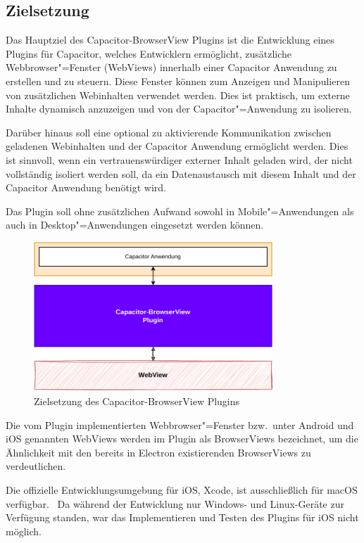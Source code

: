 \subsection{Zielsetzung}

Das Hauptziel des Capacitor-BrowserView Plugins ist die Entwicklung eines Plugins für Capacitor, welches Entwicklern ermöglicht, zusätzliche Webbrowser"=Fenster (WebViews) innerhalb einer Capacitor Anwendung zu erstellen und zu steuern.
Diese Fenster können zum Anzeigen und Manipulieren von zusätzlichen Webinhalten verwendet werden.
Dies ist praktisch, um externe Inhalte dynamisch anzuzeigen und von der Capacitor"=Anwendung zu isolieren.

Darüber hinaus soll eine optional zu aktivierende Kommunikation zwischen geladenen Webinhalten und der Capacitor Anwendung ermöglicht werden.
Dies ist sinnvoll, wenn ein vertrauenswürdiger externer Inhalt geladen wird, der nicht vollständig isoliert werden soll, da ein Datenaustausch mit diesem Inhalt und der Capacitor Anwendung benötigt wird.

Das Plugin soll ohne zusätzlichen Aufwand sowohl in Mobile"=Anwendungen als auch in Desktop"=Anwendungen eingesetzt werden können.

\begin{figure}[H]
  \centering
  \includegraphics[width=0.8\textwidth]{assets/03_Capacitor-BrowserView/01_Zielsetzung.drawio.pdf}
  \caption[Capacitor-BrowserView / Zielsetzung]{Zielsetzung des Capacitor-BrowserView Plugins}
\end{figure}

Die vom Plugin implementierten Webbrowser"=Fenster bzw.\ unter Android und iOS genannten WebViews werden im Plugin als BrowserViews bezeichnet, um die Ähnlichkeit mit den bereits in Electron existierenden BrowserViews zu verdeutlichen.
\cite{android:api, ios:api, electron:docs}

\begin{note}
  Die offizielle Entwicklungsumgebung für iOS, Xcode, ist ausschließlich für macOS verfügbar.~\cite{xcode:support}
  Da während der Entwicklung nur Windows- und Linux-Geräte zur Verfügung standen, war das Implementieren und Testen des Plugins für iOS nicht möglich.
\end{note}

